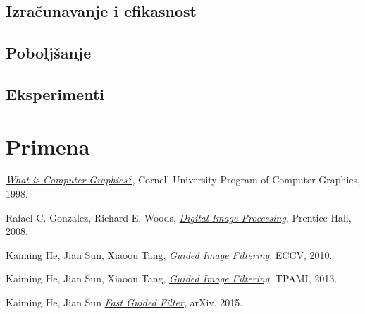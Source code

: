\documentclass[a4paper,12pt,titlepage]{article}
\begin{document}
\subsection{Izračunavanje i efikasnost}%

\subsection{Poboljšanje}%

\subsection{Eksperimenti}%

 

\section{Primena}%

\newpage
{}
\begin{thebibliography}{10}

\emph{\href{http://www.graphics.cornell.edu/online/tutorial/}{What is Computer Graphics?}},
Cornell University Program of Computer Graphics,
1998.

Rafael C. Gonzalez, Richard E. Woods,
\emph{\href{https://books.google.rs/books?id=8uGOnjRGEzoC&redir_esc=y}{Digital Image Processing}},
Prentice Hall,
2008.

Kaiming He, Jian Sun, Xiaoou Tang,
\emph{\href{http://kaiminghe.com/publications/eccv10guidedfilter.pdf}{Guided Image Filtering}},
ECCV,
2010.

Kaiming He, Jian Sun, Xiaoou Tang,
\emph{\href{http://kaiminghe.com/publications/pami12guidedfilter.pdf}{Guided Image Filtering}},
TPAMI,
2013.

Kaiming He, Jian Sun
\emph{\href{https://arxiv.org/pdf/1505.00996.pdf}{Fast Guided Filter}},
arXiv,
2015.

\end{thebibliography}
\end{document}

